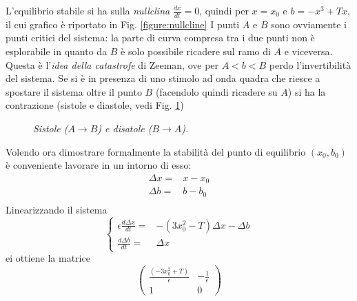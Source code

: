 \documentclass[12pt, a4paper]{book}
\theoremstyle{theorem}
\begin{document}
			L'equilibrio stabile si ha sulla \emph{nullclina} $\frac{dx}{dt}=0$, quindi per $x=x_{0}$ e $b=-x^3+Tx$, il cui grafico è riportato in Fig. \ref{figure:nullcline}
			I punti $A$ e $B$ sono ovviamente i punti critici del sistema: la parte di curva compresa tra i due punti non è esplorabile in quanto da $B$ è solo possibile ricadere sul ramo di $A$ e viceversa.
			Questa è l'\emph{idea della catastrofe} di Zeeman, ove per $A<b<B$ perdo l'invertibilità del sistema.
			Se si è in presenza di uno stimolo ad onda quadra che riesce a spostare il sistema oltre il punto $B$ (facendolo quindi ricadere su $A$) si ha la contrazione (sistole e diastole, vedi Fig. \ref{figure:sistole_diastole})
			\begin{figure}[H]
				\centering
				\caption{\emph{Sistole ($A\to B$) e disatole ($B\to A$).}}
				\label{figure:sistole_diastole}
			\end{figure}
			Volendo ora dimostrare formalmente la stabilità del punto di equilibrio $(x_0,b_0)$ è conveniente lavorare in un intorno di esso:
			\begin{equation*}
				\begin{split}
					\Delta x =& x-x_0\\
					\Delta b =& b-b_0\\
				\end{split}
			\end{equation*}
			Linearizzando il sistema
			\begin{equation*}
				\begin{cases}
					\epsilon\frac{d\Delta x}{dt}=&-\left(3x_0^2-T\right)\Delta x-\Delta b\\
					\frac{d\Delta b}{dt}=&\Delta x
				\end{cases}
			\end{equation*}
			ei ottiene la matrice
			\begin{equation*}
				\left(
				\begin{matrix}
					\frac{\left(-3x_0^2+T\right)}{\epsilon} & -\frac{1}{\epsilon}\\
					1 & 0 
				\end{matrix}
				\right)
			\end{equation*}
\end{document}
